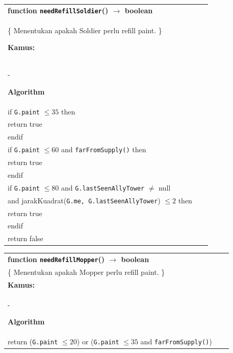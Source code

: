 \documentclass{article}
\newenvironment{pseudobox}
{
\centering
\begin{longtable}{|p{0.94\linewidth}|}
\hline
}
{
\\ \hline
\end{longtable}
\vspace{0.05cm}
}
\begin{document}
\begin{enumerate}[label=\alph*.]
\begin{enumerate}[label=\alph*.]
\begin{pseudobox}
\textbf{function \texttt{needRefillSoldier}() $\rightarrow$ boolean} \\
\{ Menentukan apakah Soldier perlu refill paint. \}

\textbf{Kamus:} \\
\hspace*{1.5em}-

\textbf{Algorithm} \\
\hspace*{1.5em}if \texttt{G.paint} $\leq 35$ then \\
\hspace*{3em}return true \\
\hspace*{1.5em}endif \\

\hspace*{1.5em}if \texttt{G.paint} $\leq 60$ and \texttt{farFromSupply()} then \\
\hspace*{3em}return true \\
\hspace*{1.5em}endif \\

\hspace*{1.5em}if \texttt{G.paint} $\leq 80$ and \texttt{G.lastSeenAllyTower} $\neq$ null \\
\hspace*{3em}and jarakKuadrat(\texttt{G.me, G.lastSeenAllyTower}) $\leq 2$ then \\
\hspace*{3em}return true \\
\hspace*{1.5em}endif \\

\hspace*{1.5em}return false
\end{pseudobox}

\begin{pseudobox}
\textbf{function \texttt{needRefillMopper}() $\rightarrow$ boolean} \\
\{ Menentukan apakah Mopper perlu refill paint. \}\\

\textbf{Kamus:} \\
\hspace*{1.5em}-

\textbf{Algorithm} \\
\hspace*{1.5em}return (\texttt{G.paint} $\leq 20$) or (\texttt{G.paint} $\leq 35$ and \texttt{farFromSupply()})
\end{pseudobox}


\end{enumerate}
\end{enumerate}
\end{document}
